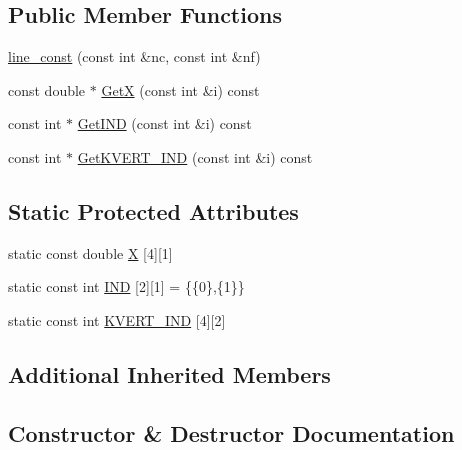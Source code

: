 \subsection*{Public Member Functions}
\begin{DoxyCompactItemize}
\item 
\mbox{\hyperlink{classfemus_1_1line__const_a9b4b4a8ef86ce0d66a33c213f5e3db8f}{line\+\_\+const}} (const int \&nc, const int \&nf)
\item 
const double $\ast$ \mbox{\hyperlink{classfemus_1_1line__const_ac4bd40b2dd52c41196e84d328d85691e}{GetX}} (const int \&i) const
\item 
const int $\ast$ \mbox{\hyperlink{classfemus_1_1line__const_ab73ed11bab4c16cde08b4f8d47ae90f7}{Get\+I\+ND}} (const int \&i) const
\item 
const int $\ast$ \mbox{\hyperlink{classfemus_1_1line__const_a6fd1093aa51a8db78167a9b0ab684a4d}{Get\+K\+V\+E\+R\+T\+\_\+\+I\+ND}} (const int \&i) const
\end{DoxyCompactItemize}
\subsection*{Static Protected Attributes}
\begin{DoxyCompactItemize}
\item 
static const double \mbox{\hyperlink{classfemus_1_1line__const_a96d93d264579499205b13a66b85b1fb5}{X}} \mbox{[}4\mbox{]}\mbox{[}1\mbox{]}
\item 
static const int \mbox{\hyperlink{classfemus_1_1line__const_af01f65e6f5ee1d738ab8cd99626424f5}{I\+ND}} \mbox{[}2\mbox{]}\mbox{[}1\mbox{]} = \{\{0\},\{1\}\}
\item 
static const int \mbox{\hyperlink{classfemus_1_1line__const_a8d269fd11121d163f8bb1d3878ffd1be}{K\+V\+E\+R\+T\+\_\+\+I\+ND}} \mbox{[}4\mbox{]}\mbox{[}2\mbox{]}
\end{DoxyCompactItemize}
\subsection*{Additional Inherited Members}


\subsection{Constructor \& Destructor Documentation}
\mbox{\label{classfemus_1_1line__const_a9b4b4a8ef86ce0d66a33c213f5e3db8f}} 
